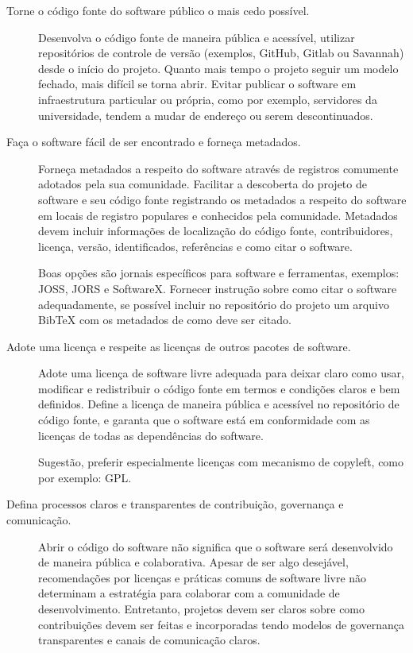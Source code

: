 \begin{description}
  \item [Torne o código fonte do software público o mais cedo possível.]

    Desenvolva o código fonte de maneira pública e acessível, utilizar
    repositórios de controle de versão (exemplos, GitHub, Gitlab ou Savannah)
    desde o início do projeto. Quanto mais tempo o projeto seguir um modelo
    fechado, mais difícil se torna abrir. Evitar publicar o software em
    infraestrutura particular ou própria, como por exemplo, servidores da
    universidade, tendem a mudar de endereço ou serem descontinuados.

  \item [Faça o software fácil de ser encontrado e forneça metadados.]

    Forneça metadados a respeito do software através de registros comumente
    adotados pela sua comunidade. Facilitar a descoberta do projeto de software
    e seu código fonte registrando os metadados a respeito do software em
    locais de registro populares e conhecidos pela comunidade. Metadados devem
    incluir informações de localização do código fonte, contribuidores,
    licença, versão, identificados, referências e como citar o software.

    Boas opções são jornais específicos para software e ferramentas, exemplos:
    JOSS, JORS e SoftwareX. Fornecer instrução sobre como citar o software
    adequadamente, se possível incluir no repositório do projeto um arquivo
    BibTeX com os metadados de como deve ser citado.

  \item [Adote uma licença e respeite as licenças de outros pacotes de software.]

    Adote uma licença de software livre adequada para deixar claro como usar,
    modificar e redistribuir o código fonte em termos e condições claros e bem
    definidos. Define a licença de maneira pública e acessível no repositório
    de código fonte, e garanta que o software está em conformidade com as
    licenças de todas as dependências do software.

    Sugestão, preferir especialmente licenças com mecanismo de copyleft, como
    por exemplo: GPL.

  \item [Defina processos claros e transparentes de contribuição, governança e \\ comunicação.]

    Abrir o código do software não significa que o software será desenvolvido
    de maneira pública e colaborativa. Apesar de ser algo desejável,
    recomendações por licenças e práticas comuns de software livre não
    determinam a estratégia para colaborar com a comunidade de desenvolvimento.
    Entretanto, projetos devem ser claros sobre como contribuições devem ser
    feitas e incorporadas tendo modelos de governança transparentes e canais de
    comunicação claros.

\end{description}

